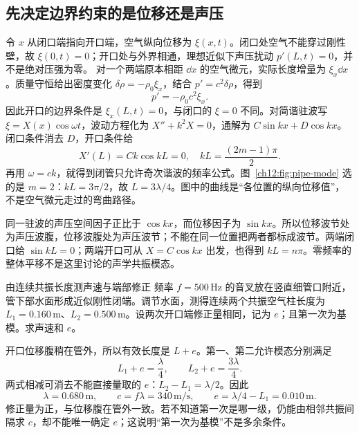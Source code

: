 \subsection{先决定边界约束的是位移还是声压}
令 $x$ 从闭口端指向开口端，空气纵向位移为 $\xi(x,t)$。闭口处空气不能穿过刚性壁，故 $\xi(0,t)=0$；开口处与外界相通，理想近似下声压扰动 $p'(L,t)=0$，并不是绝对压强为零。
对一个两端原本相距 $\dd x$ 的空气微元，实际长度增量为 $\xi_x\dd x$。质量守恒给出密度变化 $\delta\rho=-\rho_0\xi_x$，结合 $p'=c^2\delta\rho$，得到
\[
 p'=-\rho_0c^2\xi_x.
\]
因此开口的边界条件是 $\xi_x(L,t)=0$，与闭口的 $\xi=0$ 不同。对简谐驻波写 $\xi=X(x)\cos\omega t$，波动方程化为 $X''+k^2X=0$，通解为 $C\sin kx+D\cos kx$。闭口条件消去 $D$，开口条件给
\[
 X'(L)=Ck\cos kL=0,
 \quad kL=\frac{(2m-1)\pi}{2}.
\]
再用 $\omega=ck$，就得到闭管只允许奇次谐波的频率公式。图~\ref{ch12:fig:pipe-mode} 选的是 $m=2$：$kL=3\pi/2$，故 $L=3\lambda/4$。图中的曲线是“各位置的纵向位移值”，不是空气微元走过的弯曲路径。

同一驻波的声压空间因子正比于 $\cos kx$，而位移因子为 $\sin kx$。所以位移波节处为声压波腹，位移波腹处为声压波节；不能在同一位置把两者都标成波节。两端闭口给 $\sin kL=0$；两端开口可从 $X=C\cos kx$ 出发，也得到 $kL=n\pi$。零频率的整体平移不是这里讨论的声学共振模态。

\begin{origexamplebox}{由连续共振长度测声速与端部修正}\label{ch12:ex:teaching-resonance-length}
频率 $f=500\,\mathrm{Hz}$ 的音叉放在竖直细管口附近，管下部水面形成近似刚性闭端。调节水面，测得连续两个共振空气柱长度为 $L_1=0.160\,\mathrm m$、$L_2=0.500\,\mathrm m$。设两次开口端修正量相同，记为 $e$；且第一次为基模。求声速和 $e$。
\end{origexamplebox}
\begin{xesolution}
开口位移腹稍在管外，所以有效长度是 $L+e$。第一、第二允许模态分别满足
\[
 L_1+e=\frac\lambda4,\qquad L_2+e=\frac{3\lambda}4.
\]
两式相减可消去不能直接量取的 $e$：$L_2-L_1=\lambda/2$。因此
\[
 \lambda=0.680\,\mathrm m,\qquad
 c=f\lambda=340\,\mathrm{m/s},\qquad
 e=\lambda/4-L_1=0.010\,\mathrm m.
\]
修正量为正，与位移腹在管外一致。若不知道第一次是哪一级，仍能由相邻共振间隔求 $c$，却不能唯一确定 $e$；这说明“第一次为基模”不是多余条件。
\end{xesolution}
